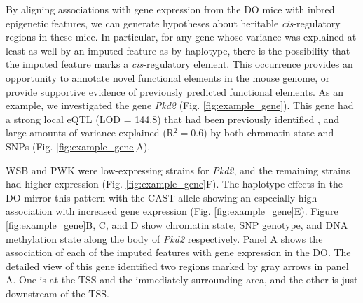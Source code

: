 \documentclass[
  11pt,
]{article}
\begin{document}
By aligning associations with gene expression from the DO mice with
inbred epigenetic features, we can generate hypotheses about heritable
\textit{cis}-regulatory regions in these mice. In particular, for any
gene whose variance was explained at least as well by an imputed feature
as by haplotype, there is the possibility that the imputed feature marks
a \textit{cis}-regulatory element. This occurrence provides an
opportunity to annotate novel functional elements in the mouse genome,
or provide supportive evidence of previously predicted functional
elements. As an example, we investigated the gene \textit{Pkd2} (Fig.
\ref{fig:example_gene}). This gene had a strong local eQTL (LOD = 144.8)
that had been previously identified
\citep{gatti2017effects, pmid27309819}, and large amounts of variance
explained (R\(^2 = 0.6\)) by both chromatin state and SNPs (Fig.
\ref{fig:example_gene}A).

WSB and PWK were low-expressing strains for \textit{Pkd2}, and the
remaining strains had higher expression (Fig. \ref{fig:example_gene}F).
The haplotype effects in the DO mirror this pattern with the CAST allele
showing an especially high association with increased gene expression
(Fig. \ref{fig:example_gene}E). Figure \ref{fig:example_gene}B, C, and D
show chromatin state, SNP genotype, and DNA methylation state along the
body of \textit{Pkd2} respectively. Panel A shows the association of
each of the imputed features with gene expression in the DO. The
detailed view of this gene identified two regions marked by gray arrows
in panel A. One is at the TSS and the immediately surrounding area, and
the other is just downstream of the TSS.
\end{document}
